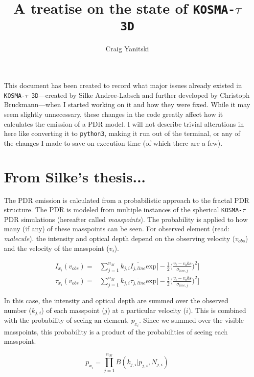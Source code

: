 \documentclass[onecolumn]{article}
\title{A treatise on the state of \texttt{KOSMA-$\tau$ 3D}}
\author{Craig Yanitski}
\date{}
\begin{document}
  \maketitle
  This document has been created to record what major issues already existed in \texttt{KOSMA-$\tau$ 3D}---created by Silke Andree-Labsch and further developed by Christoph Bruckmann---when I started working on it and how they were fixed. While it may seem slightly unnecessary, these changes in the code greatly affect how it calculates the emission of a PDR model. I will not describe trivial alterations in here like converting it to \texttt{python3}, making it run out of the terminal, or any of the changes I made to save on execution time (of which there are a few).
  
  \section{From Silke's thesis...}
  The PDR emission is calculated from a probabilistic approach to the fractal PDR structure. The PDR is modeled from multiple instances of the spherical \texttt{KOSMA-$\tau$} PDR simulations (hereafter called \textit{masspoints}). The probability is applied to how many (if any) of these masspoints can be seen. For observed element (read: \textit{molecule}). the intensity and optical depth depend on the observing velocity ($v_{obs}$) and the velocity of the masspoint ($v_i$).
  
  \begin{align*}
    I_{x_i}(v_{obs}) =& \sum_{j=1}^{n_M} k_{j,i} \overline{I_{j,line}} \mathrm{exp}\big[-\frac{1}{2}\big(\frac{v_i-v_obs}{\sigma_{line,j}}\big)^2\big] \\
    \tau_{x_i}(v_{obs}) =& \sum_{j=1}^{n_M} k_{j,i} \overline{\tau_{j,line}} \mathrm{exp}\big[-\frac{1}{2}\big(\frac{v_i-v_obs}{\sigma_{line,j}}\big)^2\big]
  \end{align*}
  
  In this case, the intensity and optical depth are summed over the observed number ($k_{j,i}$) of each masspoint ($j$) at a particular velocity ($i$). This is combined with the probability of seeing an element, $p_{x_i}$. Since we summed over the visible masspoints, this probability is a product of the probabilities of seeing each masspoint.
  
  \begin{equation*}
    p_{x_i} = \prod_{j=1}^{n_M} B(k_{j,i}|p_{j,i}, N_{j,i})
  \end{equation*}
  
\end{document}

